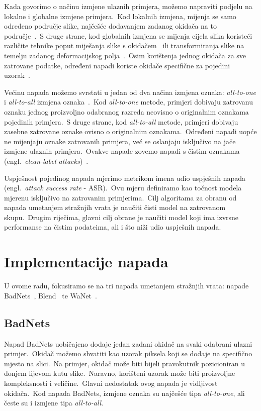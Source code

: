 \documentclass[diplomskirad]{fer}
\begin{document}
Kada govorimo o načinu izmjene ulaznih primjera, možemo napraviti podjelu na lokalne i globalne izmjene primjera.\ Kod lokalnih izmjena, mijenja se samo određeno područje slike, najčešće dodavanjem zadanog okidača na to područje~\cite{gu2019badnets}.\ 
S druge strane, kod globalnih izmjena se mijenja cijela slika koristeći različite tehnike poput miješanja slike s okidačem~\cite{chen2020backdoor} ili transformiranja slike na temelju zadanog deformacijskog polja~\cite{nguyen2021wanet}.\ 
Osim korištenja jednog okidača za sve zatrovane podatke, određeni napadi koriste okidače specifične za pojedini uzorak~\cite{li2021invisible}.\
  
Većinu napada možemo svrstati u jedan od dva načina izmjena oznaka: \textit{all-to-one} i \textit{all-to-all} izmjena oznaka~\cite{doan2022marksman}.\ 
Kod \textit{all-to-one} metode, primjeri dobivaju zatrovanu oznaku jednog proizvoljno odabranog razreda neovisno o originalnim oznakama pojedinih primjera.\ 
S druge strane, kod \textit{all-to-all} metode, primjeri dobivaju zasebne zatrovane oznake ovisno o originalnim oznakama.\ 
Određeni napadi uopće ne mijenjaju oznake zatrovanih primjera, već se oslanjaju isključivo na jače izmjene ulaznih primjera.\ Ovakve napade zovemo napadi s čistim oznakama (engl.\ \textit{clean-label attacks})~\cite{barni2019new}.\
  
Uspješnost pojedinog napada mjerimo metrikom imena udio uspješnih napada (engl.\ \textit{attack success rate} - ASR).\ Ovu mjeru definiramo kao točnost modela mjerenu isključivo na zatrovanim primjerima.\ 
Cilj algoritama za obranu od napada umetanjem stražnjih vrata je naučiti čisti model na zatrovanom skupu.\ Drugim riječima, glavni cilj obrane je naučiti model koji ima izvrsne performanse na čistim podatcima, ali i što niži udio uspješnih napada.\ 

\section{Implementacije napada}
\label{sek:impl_napada}

U ovome radu, fokusiramo se na tri napada umetanjem stražnjih vrata: napade BadNets~\cite{gu2019badnets}, Blend~\cite{chen2020backdoor} te WaNet~\cite{nguyen2021wanet}.\
  
\subsection{BadNets}
\label{sub:badnets}

Napad BadNets uobičajeno dodaje jedan zadani okidač na svaki odabrani ulazni primjer.\ Okidač možemo shvatiti kao uzorak piksela koji se dodaje na specifično mjesto na slici.\ 
Na primjer, okidač može biti bijeli pravokutnik pozicioniran u donjem lijevom kutu slike.\ Naravno, korišteni uzorak može biti proizvoljne kompleksnosti i veličine.\ 
Glavni nedostatak ovog napada je vidljivost okidača.\ Kod napada BadNets, izmjene oznaka su najčešće tipa \textit{all-to-one}, ali česte su i izmjene tipa \textit{all-to-all}.\ 
\end{document}
